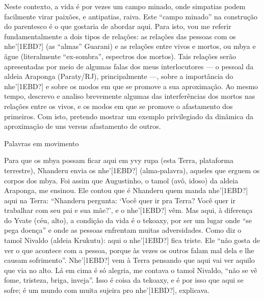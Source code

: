\documentclass{article}
\begin{document}
Neste contexto, a vida \'e por vezes um campo minado, onde simpatias
podem facilmente virar paix\~oes, e antipatias, raiva. Este
{\textquotedblleft}campo minado{\textquotedblright} na constru\c{c}\~ao
do parentesco \'e o que gostaria de abordar aqui. Para isto, vou me
referir fundamentalmente a dois tipos de rela\c{c}\~oes: as
rela\c{c}\~oes das pessoas com os nhe{\textquoteright}[1EBD?] (as
{\textquotedblleft}almas{\textquotedblright} Guarani) e as
rela\c{c}\~oes entre vivos e mortos, ou mbya e \~ague (literalmente
{\textquotedblleft}ex-sombra{\textquotedblright}, espectros dos
mortos). Tais rela\c{c}\~oes ser\~ao apresentadas por meio de algumas
falas dos meus interlocutores --- o pessoal da aldeia Araponga
(Paraty/RJ), principalmente ---, sobre a import\^ancia do
nhe{\textquoteright}[1EBD?] e sobre os modos em que se promove a sua
aproxima\c{c}\~ao. Ao mesmo tempo, descrevo e analiso brevemente
algumas das interfer\^encias dos mortos nas rela\c{c}\~oes entre os
vivos, e os modos em que se promove o afastamento dos primeiros. Com
isto, pretendo mostrar um exemplo privilegiado da din\^amica da
aproxima\c{c}\~ao de uns versus afastamento de outros.

Palavras em movimento

Para que os mbya possam ficar aqui em yvy rupa (esta Terra, plataforma
terrestre), Nhanderu envia os nhe{\textquoteright}[1EBD?]
(alma-palavra), aqueles que erguem os corpos dos mbya. Foi assim que
Augustinho, o tamo\~{i} (av\^o, idoso) da aldeia Araponga, me ensinou.
Ele contou que \'e Nhanderu quem manda nhe{\textquoteright}[1EBD?] aqui
na Terra: {\textquotedblleft}Nhanderu pergunta: {\textquoteleft}Voc\^e
quer ir pra Terra? Voc\^e quer ir trabalhar com seu pai e sua
m\~ae?{\textquoteright}, e o nhe{\textquoteright}[1EBD?] v\^em. Mas
aqui, \`a diferen\c{c}a do Yvate (c\'eu, alto), a condi\c{c}\~ao da
vida \'e o tekoaxy, por ser um lugar onde {\textquotedblleft}se pega
doen\c{c}a{\textquotedblright} e onde as pessoas enfrentam muitas
adversidades. Como diz o tamo\~{i} Nivaldo (aldeia Krukutu): aqui o
nhe{\textquoteright}[1EBD?] fica triste. Ele {\textquotedblleft}n\~ao
gosta de ver o que acontece com a pessoa, porque \`as vezes os outros
falam mal dela e lhe causam sofrimento{\textquotedblright}.
Nhe{\textquoteright}[1EBD?] vem \`a Terra pensando que aqui vai ver
aquilo que via no alto. {\textquotedbl}L\'a em cima \'e s\'o
alegria{\textquotedbl}, me contava o tamo\~{i} Nivaldo,
{\textquotedblleft}n\~ao se v\^e fome, tristeza, briga,
inveja{\textquotedblright}. Isso \'e coisa da tekoaxy, e \'e por isso
que aqui se sofre; {\textquotedbl}\'e um mundo com muita sujeira pro
nhe{\textquoteright}[1EBD?]{\textquotedbl}, explicava. 
\end{document}
